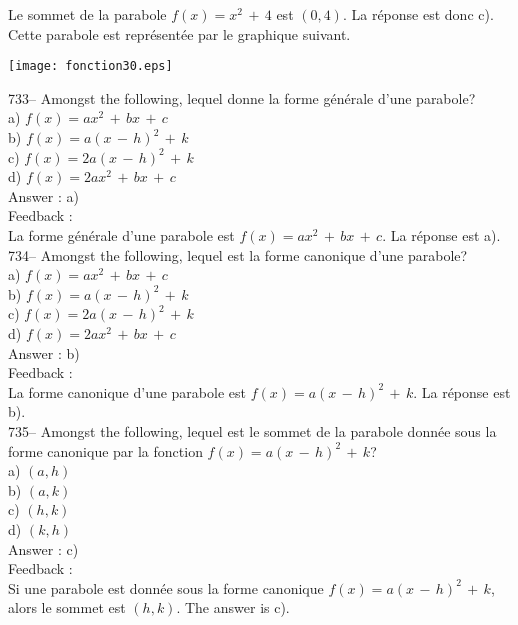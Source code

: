 ﻿\documentclass[letterpaper, 12pt]{article}
\begin{document}
Le sommet de la parabole $f\left( x\right) =x^{2}\,+\,4$ est $(0,4)$.  La
r\'eponse est donc c).  Cette parabole est repr\'esent\'ee par le graphique
suivant.\\
    \begin{center}
    \texttt{[image: fonction30.eps]}
    \end{center}

733-- Amongst the following, lequel donne la forme g\'en\'erale
d'une parabole?\\
a) $f(x)=ax^{2}\,+\,bx\,+\,c$\\
b) $f(x)=a(x\,-\,h)^{2}\,+\,k$\\
c) $f(x)=2a(x\,-\,h)^{2}\,+\,k$\\
d) $f(x)=2ax^{2}\,+\,bx\,+\,c$\\

Answer : a)\\

Feedback : \\
La forme g\'en\'erale d'une parabole est $f(x)=ax^{2}\,+\,bx\,+\,c$.  La
r\'eponse est a).\\

734-- Amongst the following, lequel est la forme canonique d'une
parabole?\\
a) $f(x)=ax^{2}\,+\,bx\,+\,c$\\
b) $f(x)=a(x\,-\,h)^{2}\,+\,k$\\
c) $f(x)=2a(x\,-\,h)^{2}\,+\,k$\\
d) $f(x)=2ax^{2}\,+\,bx\,+\,c$\\

Answer : b)\\

Feedback : \\
La forme canonique d'une parabole est $f(x)=a(x\,-\,h)^{2}\,+\,k$.  La
r\'eponse est b).\\

735-- Amongst the following, lequel est le sommet de la parabole
donn\'ee sous la forme canonique par la fonction
$f(x)=a(x\,-\,h)^{2}\,+\,k$?\\
a) $(a,h)$\\
b) $(a,k)$\\
c) $(h,k)$\\
d) $(k,h)$\\

Answer : c)\\

Feedback : \\
Si une parabole est donn\'ee sous la forme canonique
$f(x)=a(x\,-\,h)^{2}\,+\,k$, alors le sommet est $(h,k)$.  The answer is
c).\\
\end{document}
